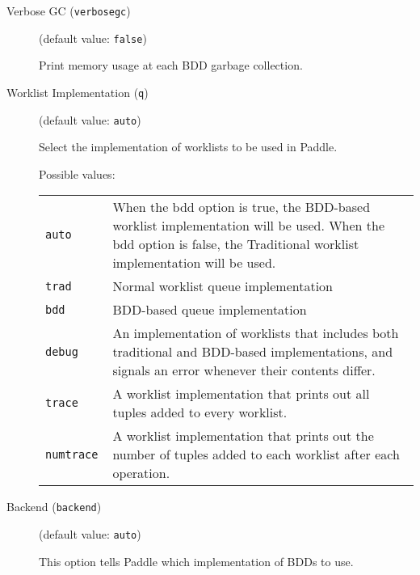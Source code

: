 \documentclass{article}
\begin{document}
\begin{description}
\item[Verbose GC ({\tt verbosegc})]
(default value: {\tt false})




Print memory usage at each BDD garbage collection.
        


\item[Worklist Implementation ({\tt q})]
(default value: {\tt auto})




Select the implementation of worklists to be used in Paddle.
        



Possible values:\\
\begin{longtable}{p{1in}p{4in}}

{\tt auto }
&

When the bdd option is true, the BDD-based worklist implementation will be used.
When the bdd option is false, the Traditional worklist implementation will be used.
\\

{\tt trad }
&

Normal worklist queue implementation
\\

{\tt bdd }
&

BDD-based queue implementation
\\

{\tt debug }
&

An implementation of worklists that includes both traditional and BDD-based
implementations, and signals an error whenever their contents differ.
\\

{\tt trace }
&

A worklist implementation that prints out all tuples added to every worklist.
\\

{\tt numtrace }
&

A worklist implementation that prints out the number of tuples added to
each worklist after each operation.
\\

\end{longtable}


\item[Backend ({\tt backend})]
(default value: {\tt auto})




This option tells Paddle which implementation of BDDs to use.
        




\end{description}
\end{document}
